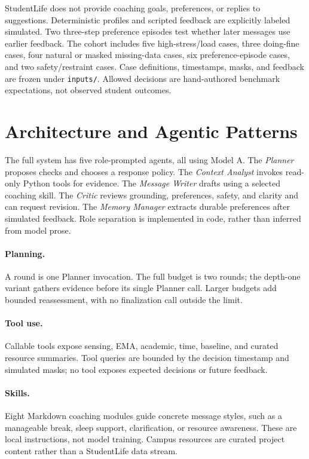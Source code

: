 \documentclass{article}
\begin{document}
StudentLife does not provide coaching goals, preferences, or replies to suggestions. Deterministic profiles and scripted feedback are explicitly labeled simulated. Two three-step preference episodes test whether later messages use earlier feedback. The cohort includes five high-stress/load cases, three doing-fine cases, four natural or masked missing-data cases, six preference-episode cases, and two safety/restraint cases. Case definitions, timestamps, masks, and feedback are frozen under \texttt{inputs/}. Allowed decisions are hand-authored benchmark expectations, not observed student outcomes.

\section{Architecture and Agentic Patterns}
The full system has five role-prompted agents, all using Model A. The \emph{Planner} proposes checks and chooses a response policy. The \emph{Context Analyst} invokes read-only Python tools for evidence. The \emph{Message Writer} drafts using a selected coaching skill. The \emph{Critic} reviews grounding, preferences, safety, and clarity and can request revision. The \emph{Memory Manager} extracts durable preferences after simulated feedback. Role separation is implemented in code, rather than inferred from model prose.

\paragraph{Planning.} A round is one Planner invocation. The full budget is two rounds; the depth-one variant gathers evidence before its single Planner call. Larger budgets add bounded reassessment, with no finalization call outside the limit.
\paragraph{Tool use.} Callable tools expose sensing, EMA, academic, time, baseline, and curated resource summaries. Tool queries are bounded by the decision timestamp and simulated masks; no tool exposes expected decisions or future feedback.
\paragraph{Skills.} Eight Markdown coaching modules guide concrete message styles, such as a manageable break, sleep support, clarification, or resource awareness. These are local instructions, not model training. Campus resources are curated project content rather than a StudentLife data stream.
\end{document}
